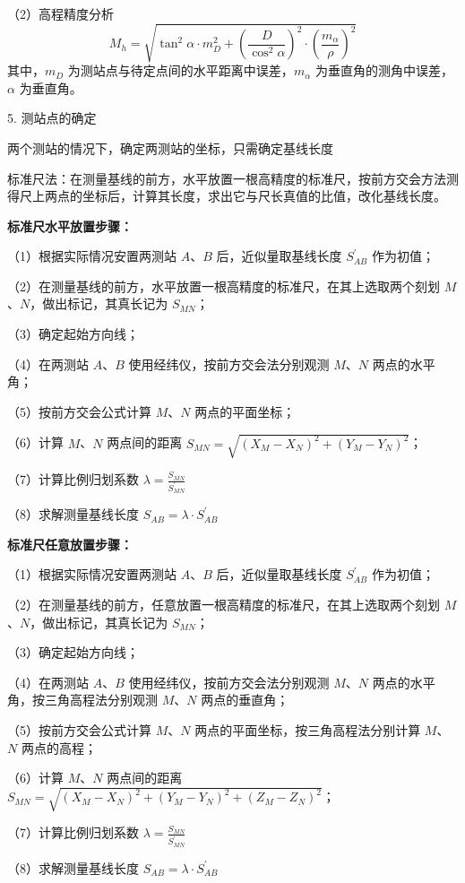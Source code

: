 \documentclass[a4paper]{ctexart}
\begin{document}
（2）高程精度分析
$$
M_h=\sqrt{\tan ^2\alpha \cdot m_{D}^{2}+\left( \frac{D}{\cos ^2\alpha} \right) ^2\cdot \left( \frac{m_{\alpha}}{\rho} \right) ^2}
$$
其中，$m_D$ 为测站点与待定点间的水平距离中误差，$m_\alpha$ 为垂直角的测角中误差，$\alpha$ 为垂直角。

5. 测站点的确定

两个测站的情况下，确定两测站的坐标，只需确定基线长度

标准尺法：在测量基线的前方，水平放置一根高精度的标准尺，按前方交会方法测得尺上两点的坐标后，计算其长度，求出它与尺长真值的比值，改化基线长度。

\textbf{标准尺水平放置步骤：}

（1）根据实际情况安置两测站 $A$、$B$ 后，近似量取基线长度 $S^{\prime}_{AB}$ 作为初值；

（2）在测量基线的前方，水平放置一根高精度的标准尺，在其上选取两个刻划 $M$、$N$，做出标记，其真长记为 $S_{MN}$；

（3）确定起始方向线；

（4）在两测站 $A$、$B$ 使用经纬仪，按前方交会法分别观测 $M$、$N$ 两点的水平角；

（5）按前方交会公式计算 $M$、$N$ 两点的平面坐标；

（6）计算 $M$、$N$ 两点间的距离 $S_{MN}=\sqrt{\left( X_M-X_N \right) ^2+\left( Y_M-Y_N \right) ^2}$；

（7）计算比例归划系数 $\lambda =\frac{S_{MN}}{S_{MN}^{'}}$

（8）求解测量基线长度 $S_{AB}=\lambda \cdot S_{AB}^{'}$

\textbf{标准尺任意放置步骤：}

（1）根据实际情况安置两测站 $A$、$B$ 后，近似量取基线长度 $S^{\prime}_{AB}$ 作为初值；

（2）在测量基线的前方，任意放置一根高精度的标准尺，在其上选取两个刻划 $M$、$N$，做出标记，其真长记为 $S_{MN}$；

（3）确定起始方向线；

（4）在两测站 $A$、$B$ 使用经纬仪，按前方交会法分别观测 $M$、$N$ 两点的水平角，按三角高程法分别观测 $M$、$N$ 两点的垂直角；

（5）按前方交会公式计算 $M$、$N$ 两点的平面坐标，按三角高程法分别计算 $M$、$N$ 两点的高程；

（6）计算 $M$、$N$ 两点间的距离 $S_{MN}=\sqrt{\left( X_M-X_N \right) ^2+\left( Y_M-Y_N \right) ^2+(Z_M-Z_N)^2}$；

（7）计算比例归划系数 $\lambda =\frac{S_{MN}}{S_{MN}^{'}}$

（8）求解测量基线长度 $S_{AB}=\lambda \cdot S_{AB}^{'}$
\end{document}
